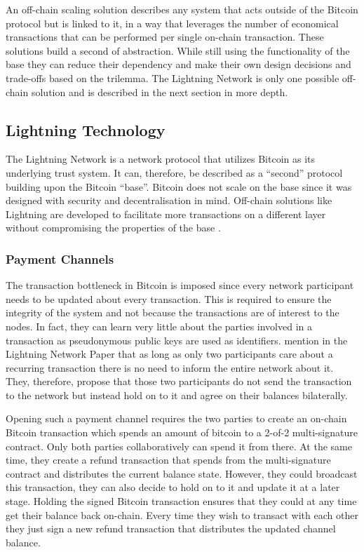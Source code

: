 \documentclass[final]{fhnwreport}       %
\begin{document}
An off-chain scaling solution describes any system that acts outside of the Bitcoin protocol but is linked to it, in a way that leverages the number of economical transactions that can be performed per single on-chain transaction. These solutions build a \gls{second} of abstraction. While still using the functionality of the \gls{base} they can reduce their dependency and make their own design decisions and trade-offs based on the \gls{trilemma}. The Lightning Network is only one possible off-chain solution and is described in the next section in more depth. 

\subsection{Lightning Technology}
The Lightning Network is a network protocol that utilizes Bitcoin as its underlying trust system. It can, therefore, be described as a ``\gls{second}'' protocol building upon the Bitcoin ``\gls{base}''. Bitcoin does not scale on the \gls{base} since it was designed with security and decentralisation in mind. Off-chain solutions like Lightning are developed to facilitate more transactions on a different layer without compromising the properties of the \gls{base} \citep{poon_bitcoin_2016}.

\subsubsection{Payment Channels}
The transaction bottleneck in Bitcoin is imposed since every network participant needs to be updated about every transaction. This is required to ensure the integrity of the system and not because the transactions are of interest to the nodes. In fact, they can learn very little about the parties involved in a transaction as \gls{pseudonymous} public keys are used as identifiers. \textcite{poon_bitcoin_2016} mention in the Lightning Network Paper that as long as only two participants care about a recurring transaction there is no need to inform the entire network about it. They, therefore, propose that those two participants do not send the transaction to the network but instead hold on to it and agree on their balances bilaterally. 

Opening such a payment channel requires the two parties to create an on-chain Bitcoin transaction which spends an amount of bitcoin to a 2-of-2 multi-signature contract. Only both parties collaboratively can spend it from there. At the same time, they create a refund transaction that spends from the multi-signature contract and distributes the current balance state. However, they could broadcast this transaction, they can also decide to hold on to it and update it at a later stage. Holding the signed Bitcoin transaction ensures that they could at any time get their balance back on-chain. Every time they wish to transact with each other they just sign a new refund transaction that distributes the updated channel balance.
\end{document}
